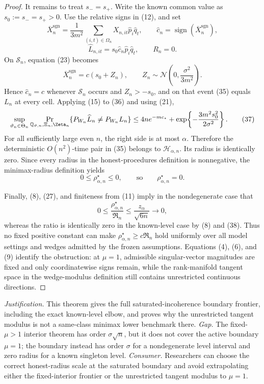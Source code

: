 \documentclass{article}
\begin{document}
\begin{proof}
It remains to treat \(s_-=s_+\).  Write the known common value as \(s_0:=s_-=s_+>0\).  Use the relative signs in (12), and set
\[
\overline X_n^{\mathrm{sgn}}
=\frac1{3m^2}\sum_{(i,t)\in\Omega_n}X_{n,it}\widehat p_i\widehat q_t,
\qquad
\widehat c_n=\operatorname{sign}(\overline X_n^{\mathrm{sgn}}),
\]
\[
\widehat L_{n,it}=s_0\widehat c_n\widehat p_i\widehat q_t,
\qquad R_n=0.                                           \tag{35}
\]
On \(\mathcal S_n\), equation (23) becomes
\[
\overline X_n^{\mathrm{sgn}}=c(s_0+Z_n),
\qquad
Z_n\sim\mathcal N\!\left(0,\frac{\sigma^2}{3m^2}\right).       \tag{36}
\]
Hence \(\widehat c_n=c\) whenever \(\mathcal S_n\) occurs and \(Z_n>-s_0\), and on that event (35) equals \(L_n\) at every cell.  Applying (15) to (36) and using (21),
\[
\sup_{\vartheta_n\in\Theta_n}
\Pr_{\mathbb Q_{\vartheta,n},\Xi_n,\Zeta_n}
\{P_{W_n}\widehat L_n\ne P_{W_n}L_n\}
\le4ne^{-mc_\star}
+\exp\!\left\{-\frac{3m^2s_0^2}{2\sigma^2}\right\}.            \tag{37}
\]
For all sufficiently large even \(n\), the right side is at most \(\alpha\).  Therefore the deterministic \(O(n^2)\)-time pair in (35) belongs to \(\mathcal H_{\alpha,n}\).  Its radius is identically zero.  Since every radius in the honest-procedures definition is nonnegative, the minimax-radius definition yields
\[
0\le\rho_{\alpha,n}^{\star}\le0,
\qquad\text{so}\qquad \rho_{\alpha,n}^{\star}=0.      \tag{38}
\]

Finally, (8), (27), and finiteness from (11) imply in the nondegenerate case that
\[
0\le\frac{\rho_{\alpha,n}^{\star}}{\mathfrak R_n}
\le\frac{z_\alpha}{\sqrt{6n}}\longrightarrow0,         \tag{39}
\]
whereas the ratio is identically zero in the known-level case by (8) and (38).  Thus no fixed positive constant can make \(\rho_{\alpha,n}^{\star}\ge c\mathfrak R_n\) hold uniformly over all model settings and wedges admitted by the frozen assumptions.  Equations (4), (6), and (9) identify the obstruction: at \(\mu=1\), admissible singular-vector magnitudes are fixed and only coordinatewise signs remain, while the rank-manifold tangent space in the wedge-modulus definition still contains unrestricted continuous directions.
\end{proof}
\par\smallskip\noindent \textit{Justification.} This theorem gives the full saturated-incoherence boundary frontier, including the exact known-level elbow, and proves why the unrestricted tangent modulus is not a same-class minimax lower benchmark there. \textit{Gap.} The fixed-\(\mu>1\) interior theorem has order \(\sigma\sqrt n\), but it does not cover the active boundary \(\mu=1\); the boundary instead has order \(\sigma\) for a nondegenerate level interval and zero radius for a known singleton level. \textit{Consumer.} Researchers can choose the correct honest-radius scale at the saturated boundary and avoid extrapolating either the fixed-interior frontier or the unrestricted tangent modulus to \(\mu=1\).
\end{document}
